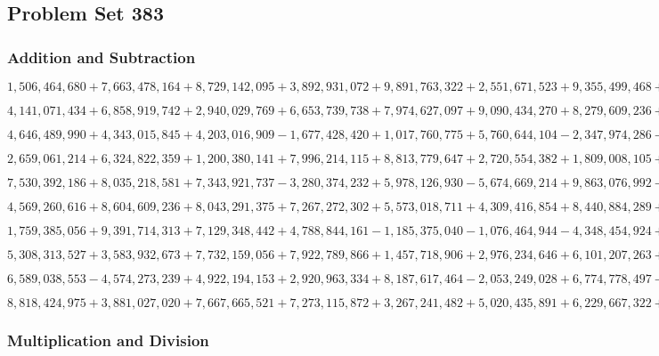 \hypertarget{problem-set-383}{%
\subsection{Problem Set 383}\label{problem-set-383}}

\hypertarget{addition-and-subtraction}{%
\subsubsection{Addition and
Subtraction}\label{addition-and-subtraction}}

\(1,506,464,680+7,663,478,164+8,729,142,095+3,892,931,072+9,891,763,322+2,551,671,523+9,355,499,468+6,084,160,274+2,405,661,887+4,510,918,516\)

\(4,141,071,434+6,858,919,742+2,940,029,769+6,653,739,738+7,974,627,097+9,090,434,270+8,279,609,236+6,951,590,852+8,659,185,587+5,678,782,170\)

\(4,646,489,990+4,343,015,845+4,203,016,909-1,677,428,420+1,017,760,775+5,760,644,104-2,347,974,286-9,499,729,910+4,636,587,673-4,847,742,797\)

\(2,659,061,214+6,324,822,359+1,200,380,141+7,996,214,115+8,813,779,647+2,720,554,382+1,809,008,105+2,165,794,471+4,428,242,945+4,799,783,132\)

\(7,530,392,186+8,035,218,581+7,343,921,737-3,280,374,232+5,978,126,930-5,674,669,214+9,863,076,992-5,578,241,307-2,306,309,723+9,001,065,647\)

\(4,569,260,616+8,604,609,236+8,043,291,375+7,267,272,302+5,573,018,711+4,309,416,854+8,440,884,289+3,636,484,663+4,412,184,383+7,933,653,360\)

\(1,759,385,056+9,391,714,313+7,129,348,442+4,788,844,161-1,185,375,040-1,076,464,944-4,348,454,924+7,396,486,953+4,924,853,907-7,117,058,519\)

\(5,308,313,527+3,583,932,673+7,732,159,056+7,922,789,866+1,457,718,906+2,976,234,646+6,101,207,263+1,342,131,243+9,986,752,746+4,046,948,310\)

\(6,589,038,553-4,574,273,239+4,922,194,153+2,920,963,334+8,187,617,464-2,053,249,028+6,774,778,497-9,288,895,467+3,944,242,084-8,699,723,918\)

\(8,818,424,975+3,881,027,020+7,667,665,521+7,273,115,872+3,267,241,482+5,020,435,891+6,229,667,322+4,799,377,883+1,041,964,804+7,124,190,077\)

\hypertarget{multiplication-and-division}{%
\subsubsection{Multiplication and
Division}\label{multiplication-and-division}}

